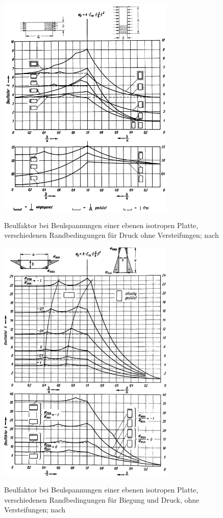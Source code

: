 \begin{figure}[h]
	\centering
	\includegraphics[width=0.75\textwidth]{Bilder/Hertel Druck.png}
	\label{fig: Hertel_Druck}
	\caption{Beulfaktor bei Beulspannungen einer ebenen isotropen Platte, verschiedenen Randbedingungen für Druck ohne Versteifungen; nach \cite{item1}}
\end{figure}
\begin{figure}[h]
	\centering
	\includegraphics[width=0.75\textwidth]{Bilder/Hertel Biegung.png}
	\label{fig: Hertel_Biegung}
	\caption{Beulfaktor bei Beulspannungen einer ebenen isotropen Platte, verschiedenen Randbedingungen für Biegung und Druck, ohne Versteifungen; nach \cite{item1}}
\end{figure}
